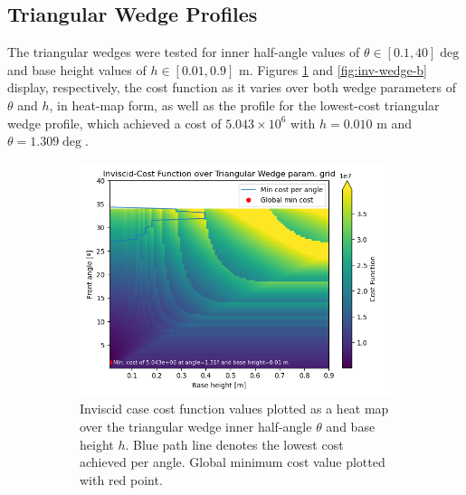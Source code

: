 \documentclass[11pt]{article}
\begin{document}
\subsection{Triangular Wedge Profiles}
The triangular wedges were tested for inner half-angle values of $\theta \in [0.1, 40]\deg$ and base height values of $h \in [0.01, 0.9]\text{ m}$. Figures \ref{fig:inv-wedge-a} and \ref{fig:inv-wedge-b} display, respectively, the cost function as it varies over both wedge parameters of $\theta$ and $h$, in heat-map form, as well as the profile for the lowest-cost triangular wedge profile, which achieved a cost of $5.043 \times 10^6$ with $h=0.010 \text{ m}$ and $\theta=1.309\deg$.
\begin{figure}[H]
\centering
\begin{subfigure}[b]{0.54\textwidth}
    \centering
    \includegraphics[width=\linewidth]{../results/inviscid/wedges.png}
    \caption{Inviscid case cost function values plotted as a heat map over the triangular wedge inner half-angle $\theta$ and base height $h$. Blue path line denotes the lowest cost achieved per angle. Global minimum cost value plotted with red point.}
    \label{fig:inv-wedge-a}
\end{subfigure}
\hfill
\begin{subfigure}[b]{0.44\textwidth}
    \centering

\end{subfigure}
\end{figure}
\end{document}
